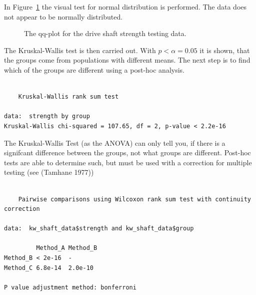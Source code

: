 \documentclass[
  a4paper,
]{scrbook}
\begin{document}
In Figure~\ref{fig-kruskal-qq} the visual test for normal distribution
is performed. The data does not appear to be normally distributed.

\begin{figure}[H]


\caption{\label{fig-kruskal-qq}The qq-plot for the drive shaft strength
testing data.}

\end{figure}%

The Kruskal-Wallis test is then carried out. With \(p< \alpha = 0.05\)
it is shown, that the groups come from populations with different means.
The next step is to find which of the groups are different using a
post-hoc analysis.

\begin{verbatim}

    Kruskal-Wallis rank sum test

data:  strength by group
Kruskal-Wallis chi-squared = 107.65, df = 2, p-value < 2.2e-16
\end{verbatim}

The Kruskal-Wallis Test (as the ANOVA) can only tell you, if there is a
signifcant difference between the groups, not what groups are different.
Post-hoc tests are able to determine such, but must be used with a
correction for multiple testing (see (Tamhane 1977))

\begin{verbatim}

    Pairwise comparisons using Wilcoxon rank sum test with continuity correction 

data:  kw_shaft_data$strength and kw_shaft_data$group 

         Method_A Method_B
Method_B < 2e-16  -       
Method_C 6.8e-14  2.0e-10 

P value adjustment method: bonferroni 
\end{verbatim}
\end{document}
